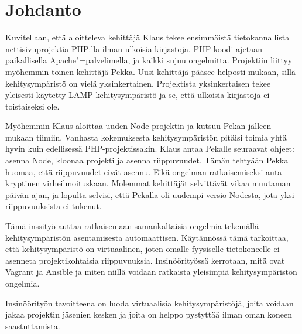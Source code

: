 \chapter{Johdanto}

Kuvitellaan, että aloitteleva kehittäjä Klaus tekee ensimmäistä tietokannallista nettisivuprojektia PHP:lla ilman ulkoisia kirjastoja. PHP-koodi ajetaan paikallisella Apache"=palvelimella, ja kaikki sujuu ongelmitta. Projektiin liittyy myöhemmin toinen kehittäjä Pekka. Uusi kehittäjä pääsee helposti mukaan, sillä kehitysympäristö on vielä yksinkertainen. Projektista yksinkertaisen tekee yleisesti käytetty LAMP-kehitysympäristö ja se, että ulkoisia kirjastoja ei toistaiseksi ole.

Myöhemmin Klaus aloittaa uuden Node-projektin ja kutsuu Pekan jälleen mukaan tiimiin. Vanhasta kokemuksesta kehitysympäristön pitäisi toimia yhtä hyvin kuin edellisessä PHP-projektissakin. Klaus antaa Pekalle seuraavat ohjeet: asenna Node, kloonaa projekti ja asenna riippuvuudet. Tämän tehtyään Pekka huomaa, että riippuvuudet eivät asennu. Eikä ongelman ratkaisemiseksi auta kryptinen virheilmoituskaan. Molemmat kehittäjät selvittävät vikaa muutaman päivän ajan, ja lopulta selvisi, että Pekalla oli uudempi versio Nodesta, jota yksi riippuvuuksista ei tukenut.

Tämä inssityö auttaa ratkaisemaan samankaltaisia ongelmia tekemällä  kehitysympäristön asentamisesta automaattisen. Käytännössä tämä tarkoittaa, että kehitysympäristö on virtuaalinen, joten omalle fyysiselle tietokoneelle ei asenneta projektikohtaisia riippuvuuksia. Insinöörityössä kerrotaan, mitä ovat Vagrant ja Ansible ja miten niillä voidaan ratkaista yleisimpiä kehitysympäristön ongelmia.

Insinöörityön tavoitteena on luoda virtuaalisia kehitysympäristöjä, joita voidaan jakaa projektin jäsenien kesken ja joita on helppo pystyttää ilman oman koneen saastuttamista.

